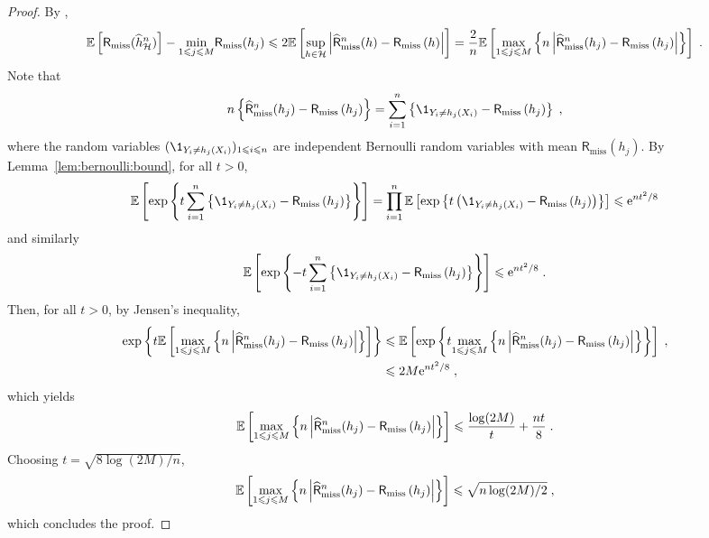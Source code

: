 \begin{proof}
By ,
$$
\mathbb{E}\left[\mathsf{R}_{\mathrm{miss}}(\widehat h^n_{\mathcal{H}})\right]  - \underset{1\leqslant j \leqslant M}{\min}\mathsf{R}_{\mathrm{miss}}(h_j) \leqslant  2 \mathbb{E}\left[\underset{h\in\mathcal{H}}{\sup}\left|\widehat {\mathsf{R}}^n_{\mathrm{miss}}(h) - \mathsf{R}_{\mathrm{miss}}\left(h\right)\right|  \right]=\frac{2 }{n} \mathbb{E}\left[ \underset{1\leqslant j\leqslant M}{\max}\left\{n\left|\widehat {\mathsf{R}}^n_{\mathrm{miss}}(h_j) - \mathsf{R}_{\mathrm{miss}}\left(h_j\right)\right| \right\}\right]\;.
$$
Note that
\[
n\left\{\widehat {\mathsf{R}}^n_{\mathrm{miss}}(h_j) -  \mathsf{R}_{\mathrm{miss}}\left(h_j\right)\right\} = \sum_{i=1}^n \left\{\1_{Y_i \neq h_j(X_i)}  -  \mathsf{R}_{\mathrm{miss}}\left(h_j\right)\right\}\eqsp,
\]
where the random variables $(\1_{Y_i \neq h_j(X_i)})_{1\leqslant i \leqslant n}$ are independent Bernoulli random variables with mean $\mathsf{R}_{\mathrm{miss}}(h_j)$. By Lemma~\ref{lem:bernoulli:bound}, for all $t>0$,
\[
\bE\left[\mathrm{exp}\left\{t\sum_{i=1}^n \left\{\1_{Y_i \neq h_j(X_i)}  -  \mathsf{R}_{\mathrm{miss}}\left(h_j\right)\right\}\right\}\right] = \prod_{i=1}^n \bE\left[\mathrm{exp}\left\{t\left(\1_{Y_i \neq h_j(X_i)}  -  \mathsf{R}_{\mathrm{miss}}\left(h_j\right)\right)\right\}\right] \leqslant \rme^{nt^2/8}
\]
and similarly
\[
\bE\left[\mathrm{exp}\left\{-t\sum_{i=1}^n \left\{\1_{Y_i \neq h_j(X_i)}  -  \mathsf{R}_{\mathrm{miss}}\left(h_j\right)\right\}\right\}\right] \leqslant \rme^{nt^2/8}\eqsp.
\]
Then, for all $t>0$, by Jensen's inequality,
\begin{align*}
\mathrm{exp}\left\{t \mathbb{E}\left[ \underset{1\leqslant j\leqslant M}{\max}\left\{n\left|\widehat {\mathsf{R}}^n_{\mathrm{miss}}(h_j) - \mathsf{R}_{\mathrm{miss}}\left(h_j\right)\right| \right\}\right]\right\} &\leqslant \mathbb{E}\left[\mathrm{exp}\left\{t\underset{1\leqslant j\leqslant M}{\max}\left\{n\left|\widehat {\mathsf{R}}^n_{\mathrm{miss}}(h_j) - \mathsf{R}_{\mathrm{miss}}\left(h_j\right)\right|\right\}\right\}\right] \;,\\
&\leqslant 2M\mathrm{e}^{nt^2/8}\;,
\end{align*}
which yields
\[
 \mathbb{E}\left[ \underset{1\leqslant j\leqslant M}{\max}\left\{n\left|\widehat {\mathsf{R}}^n_{\mathrm{miss}}(h_j) - \mathsf{R}_{\mathrm{miss}}\left(h_j\right)\right| \right\}\right] \leqslant \frac{\log (2M)}{t} + \frac{nt}{8}\;.
\]
Choosing $t= \sqrt{8\log (2M)/n}$,
\[
 \mathbb{E}\left[ \underset{1\leqslant j\leqslant M}{\max}\left\{n\left|\widehat {\mathsf{R}}^n_{\mathrm{miss}}(h_j) - \mathsf{R}_{\mathrm{miss}}\left(h_j\right)\right|\right\}\right] \leqslant \sqrt{n\log(2M)/2}\;,
\]
which concludes the proof.
\end{proof}
